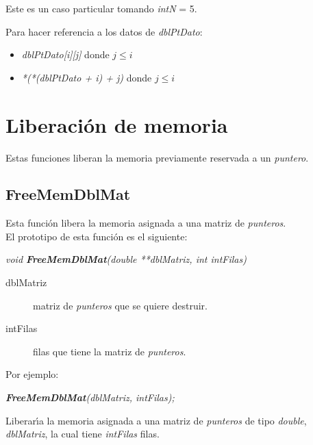 Este es un caso particular tomando \emph{intN} = 5.\newline

Para hacer referencia a los datos de \emph{dblPtDato}:

\begin{itemize}
\item \emph{dblPtDato[i][j]} donde $j \leq i$
\item \emph{*(*(dblPtDato + i) + j)} donde $j \leq i$
\end{itemize}

\newpage

\section{Liberaci\'on de memoria}
Estas funciones liberan la memoria previamente reservada a un \emph{puntero}.

\subsection{FreeMemDblMat}
Esta funci\'on libera la memoria asignada a una matriz de \emph{punteros}.\\

El prototipo de esta funci\'on es el siguiente:

\begin{center} 
\emph{void \textbf{FreeMemDblMat}(double **dblMatriz, int intFilas)}
\end{center}

\begin{description}
\item[dblMatriz] matriz de \emph{punteros} que se quiere destruir.
\item[intFilas] filas que tiene la matriz de \emph{punteros}.
\end{description}

Por ejemplo:

\begin{center}
\emph{\textbf{FreeMemDblMat}(dblMatriz, intFilas);}
\end{center}

Liberar\'{\i}a la memoria asignada a una matriz de \emph{punteros} de tipo
\emph{double}, \emph{dblMatriz}, la cual tiene \emph{intFilas} filas.

%
%

